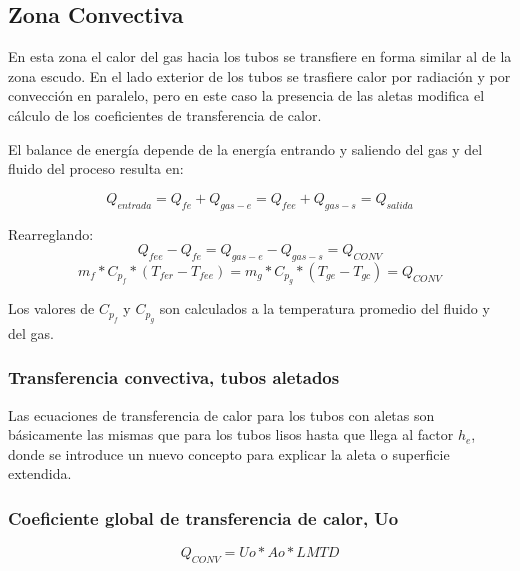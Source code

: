 \subsection{Zona Convectiva}
\par En esta zona el calor del gas hacia los tubos se transfiere en forma similar al de la zona escudo. En el lado exterior de los tubos se trasfiere calor por radiación y por convección en paralelo, pero en este caso la presencia de las aletas modifica el cálculo de los coeficientes de transferencia de calor.

\par El balance de energía depende de la energía entrando y saliendo del gas y del fluido del proceso resulta en:

\begin{equation}
\label{eq:conv}
Q_{entrada} = Q_{fe} + Q_{gas-e} = Q_{fee} + Q_{gas-s} = Q_{salida}
\end{equation}

\par Rearreglando:
\begin{equation*}
Q_{fee} - Q_{fe} = Q_{gas-e} - Q_{gas-s} = Q_{CONV}
\end{equation*}
\begin{equation}
\label{eq:qconv}
m_{f} *C_{p_f} *(T_{fer} - T_{fee}) = 
m_{g} *C_{p_g} *(T_{ge}  - T_{gc}) = Q_{CONV}
\end{equation}
\par Los valores de $C_{p_f}$ y $C_{p_g}$ son calculados a la temperatura promedio del fluido y del gas.

\subsubsection{Transferencia convectiva, tubos aletados}
\par Las ecuaciones de transferencia de calor para los tubos con aletas son básicamente las mismas que para los tubos lisos hasta que llega al factor $h_e$, donde se introduce un nuevo concepto para explicar la aleta o superficie extendida.

\subsubsection{Coeficiente global de transferencia de calor, Uo}

\begin{equation}
Q_{CONV} = Uo *Ao *LMTD
\end{equation}

